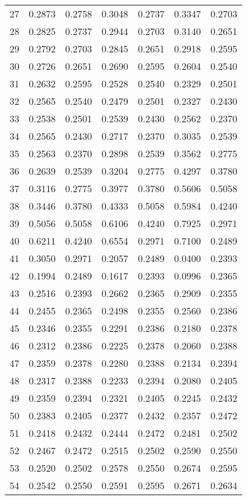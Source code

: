 \begin{center}
\begin{longtable}{lcccccc}
    27 &0.2873&0.2758&0.3048&0.2737&0.3347&0.2703 \\
    28 &0.2825&0.2737&0.2944&0.2703&0.3140&0.2651 \\
    29 &0.2792&0.2703&0.2845&0.2651&0.2918&0.2595 \\
    30 &0.2726&0.2651&0.2690&0.2595&0.2604&0.2540 \\
    31 &0.2632&0.2595&0.2528&0.2540&0.2329&0.2501 \\
    32 &0.2565&0.2540&0.2479&0.2501&0.2327&0.2430 \\
    33 &0.2538&0.2501&0.2539&0.2430&0.2562&0.2370 \\
    34 &0.2565&0.2430&0.2717&0.2370&0.3035&0.2539 \\
    35 &0.2563&0.2370&0.2898&0.2539&0.3562&0.2775 \\
    36 &0.2639&0.2539&0.3204&0.2775&0.4297&0.3780 \\
    37 &0.3116&0.2775&0.3977&0.3780&0.5606&0.5058 \\
    38 &0.3446&0.3780&0.4333&0.5058&0.5984&0.4240 \\
    39 &0.5056&0.5058&0.6106&0.4240&0.7925&0.2971 \\
    40 &0.6211&0.4240&0.6554&0.2971&0.7100&0.2489 \\
    41 &0.3050&0.2971&0.2057&0.2489&0.0400&0.2393 \\
    42 &0.1994&0.2489&0.1617&0.2393&0.0996&0.2365 \\
    43 &0.2516&0.2393&0.2662&0.2365&0.2909&0.2355 \\
    44 &0.2455&0.2365&0.2498&0.2355&0.2560&0.2386 \\
    45 &0.2346&0.2355&0.2291&0.2386&0.2180&0.2378 \\
    46 &0.2312&0.2386&0.2225&0.2378&0.2060&0.2388 \\
    47 &0.2359&0.2378&0.2280&0.2388&0.2134&0.2394 \\
    48 &0.2317&0.2388&0.2233&0.2394&0.2080&0.2405 \\
    49 &0.2359&0.2394&0.2321&0.2405&0.2245&0.2432 \\
    50 &0.2383&0.2405&0.2377&0.2432&0.2357&0.2472 \\
    51 &0.2418&0.2432&0.2444&0.2472&0.2481&0.2502 \\
    52 &0.2467&0.2472&0.2515&0.2502&0.2590&0.2550 \\
    53 &0.2520&0.2502&0.2578&0.2550&0.2674&0.2595 \\
    54 &0.2542&0.2550&0.2591&0.2595&0.2671&0.2634 \\

\end{longtable}
\end{center}
